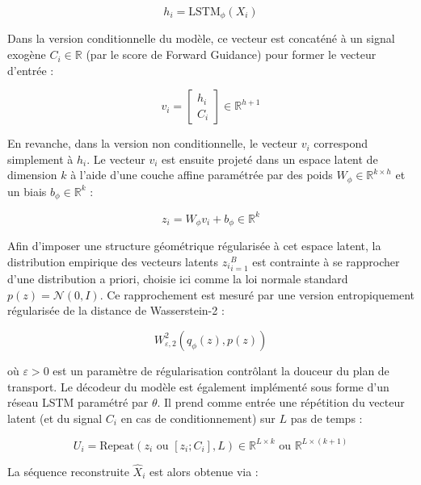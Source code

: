 \begin{equation}
h_i = \mathrm{LSTM}_{\phi}(X_i)
\end{equation}

Dans la version conditionnelle du modèle, ce vecteur est concaténé à un signal exogène $C_i \in \mathbb{R}$ (par le score de Forward Guidance) pour former le vecteur d’entrée :

\begin{equation}
v_i = \begin{bmatrix} h_i \\ C_i \end{bmatrix} \in \mathbb{R}^{h+1}
\end{equation}

En revanche, dans la version non conditionnelle, le vecteur $v_i$ correspond simplement à $h_i$. Le vecteur $v_i$ est ensuite projeté dans un espace latent de dimension $k$ à l’aide d’une couche affine paramétrée par des poids $W_\phi \in \mathbb{R}^{k \times h}$ et un biais $b_\phi \in \mathbb{R}^k$ :

\begin{equation}
z_i = W_\phi v_i + b_\phi \in \mathbb{R}^k
\end{equation}

Afin d'imposer une structure géométrique régularisée à cet espace latent, la distribution empirique des vecteurs latents ${z_i}_{i=1}^B$ est contrainte à se rapprocher d’une distribution a priori, choisie ici comme la loi normale standard $p(z) = \mathcal{N}(0, I)$. Ce rapprochement est mesuré par une version entropiquement régularisée de la distance de Wasserstein-2 :

\begin{equation}
W^2_{\varepsilon, 2}\left(q_\phi(z), p(z)\right)
\end{equation}

où $\varepsilon > 0$ est un paramètre de régularisation contrôlant la douceur du plan de transport. Le décodeur du modèle est également implémenté sous forme d’un réseau LSTM paramétré par $\theta$. Il prend comme entrée une répétition du vecteur latent (et du signal $C_i$ en cas de conditionnement) sur $L$ pas de temps :

\begin{equation}
U_i = \text{Repeat}(z_i \text{ ou } [z_i; C_i], L) \in \mathbb{R}^{L \times k} \text{ ou } \mathbb{R}^{L \times (k+1)}
\end{equation}

La séquence reconstruite $\widehat{X}_i$ est alors obtenue via :

